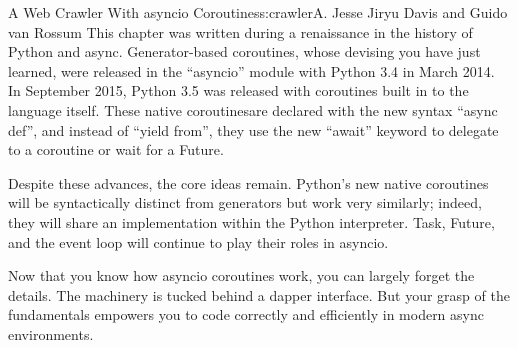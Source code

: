 \begin{aosachapter}{A Web Crawler With asyncio Coroutines}{s:crawler}{A. Jesse Jiryu Davis and Guido van Rossum}
This chapter was written during a renaissance in the history of Python
and async. Generator-based coroutines, whose devising you have just
learned, were released in the ``asyncio'' module with Python 3.4 in
March 2014. In September 2015, Python 3.5 was released with coroutines
built in to the language itself. These native coroutinesare declared
with the new syntax ``async def'', and instead of ``yield from'', they
use the new ``await'' keyword to delegate to a coroutine or wait for a
Future.

Despite these advances, the core ideas remain. Python's new native
coroutines will be syntactically distinct from generators but work very
similarly; indeed, they will share an implementation within the Python
interpreter. Task, Future, and the event loop will continue to play
their roles in asyncio.

Now that you know how asyncio coroutines work, you can largely forget
the details. The machinery is tucked behind a dapper interface. But your
grasp of the fundamentals empowers you to code correctly and efficiently
in modern async environments.

\end{aosachapter}
